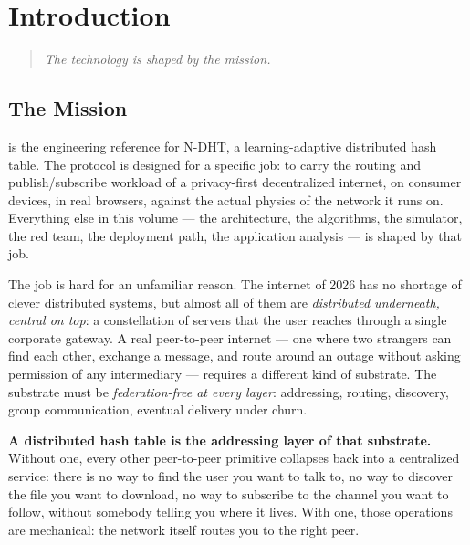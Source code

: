 \documentclass[twoside,nobib]{tufte-book}
\newcommand{\NDHT}{N-DHT\xspace}
\begin{document}
\chapter{Introduction}
\label{ch:intro}

\begin{quote}
  \itshape The technology is shaped by the mission.
\end{quote}

\section{The Mission}

 is the engineering reference for \NDHT, a
learning-adaptive distributed hash table. The protocol is designed for
a specific job: to carry the routing and publish/subscribe workload
of a privacy-first decentralized internet, on consumer devices, in
real browsers, against the actual physics of the network it runs on.
Everything else in this volume --- the architecture, the algorithms,
the simulator, the red team, the deployment path, the application
analysis --- is shaped by that job.

The job is hard for an unfamiliar reason. The internet of 2026 has
no shortage of clever distributed systems, but almost all of them
are \emph{distributed underneath, central on top}: a constellation of
servers that the user reaches through a single corporate
gateway. A real peer-to-peer
internet --- one where two strangers can find each other, exchange a
message, and route around an outage without asking permission of any
intermediary --- requires a different kind of substrate. The substrate
must be \emph{federation-free at every layer}: addressing, routing,
discovery, group communication, eventual delivery under churn.

\textbf{A distributed hash table is the addressing layer of that
substrate.} Without one, every other peer-to-peer primitive
collapses back into a centralized service: there is no way to find
the user you want to talk to, no way to discover the file you want to
download, no way to subscribe to the channel you want to follow,
without somebody telling you where it lives. With one, those
operations are mechanical: the network itself routes you to the right
peer.
\end{document}
